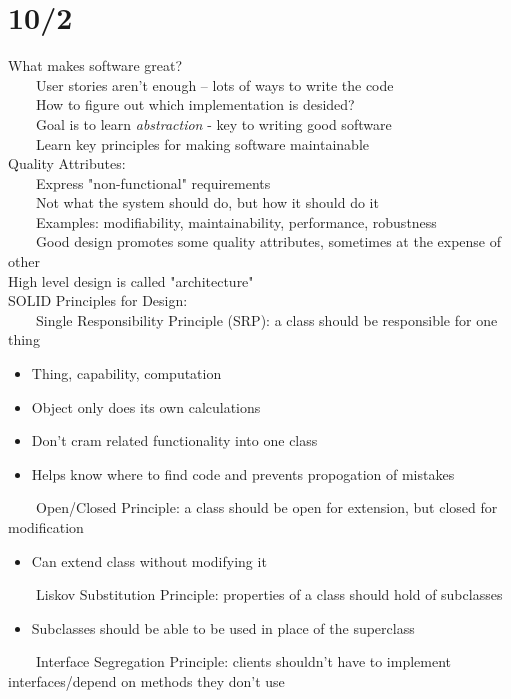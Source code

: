 \documentclass[10pt,letterpaper,unboxed,cm]{article}
\newcommand{\tab}{~~~~}
\begin{document}
\section{10/2}
What makes software great?\\
\tab User stories aren't enough -- lots of ways to write the code\\
\tab How to figure out which implementation is desided?\\
\tab Goal is to learn \textit{abstraction} - key to writing good software\\
\tab Learn key principles for making software maintainable\\
Quality Attributes: \\
\tab Express "non-functional" requirements\\
\tab Not what the system should do, but how it should do it\\
\tab Examples: modifiability, maintainability, performance, robustness\\
\tab Good design promotes some quality attributes, sometimes at the expense of other\\
High level design is called "architecture"\\
SOLID Principles for Design:\\
\tab Single Responsibility Principle (SRP): a class should be responsible for one thing\\
\begin{itemize}
    \item Thing, capability, computation
    \item Object only does its own calculations
    \item Don't cram related functionality into one class
    \item Helps know where to find code and prevents propogation of mistakes
\end{itemize}
\tab Open/Closed Principle: a class should be open for extension, but closed for modification
\begin{itemize}
    \item Can extend class without modifying it
\end{itemize}
\tab Liskov Substitution Principle: properties of a class should hold of subclasses
\begin{itemize}
    \item Subclasses should be able to be used in place of the superclass
\end{itemize}
\tab Interface Segregation Principle: clients shouldn't have to implement interfaces/depend on methods they don't use
\end{document}

